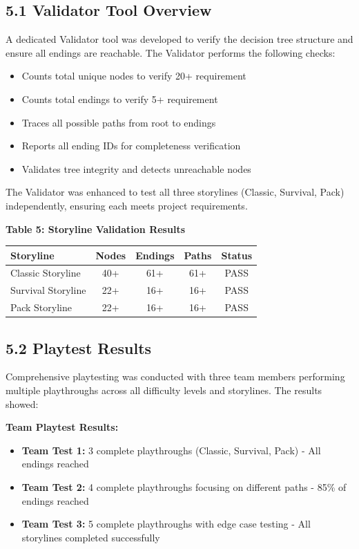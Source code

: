 \documentclass[12pt,a4paper]{article}
\begin{document}
\subsection{5.1 Validator Tool Overview}
A dedicated Validator tool was developed to verify the decision tree structure and ensure all endings are reachable. The Validator performs the following checks:
\begin{itemize}
	\item Counts total unique nodes to verify 20+ requirement
	\item Counts total endings to verify 5+ requirement
	\item Traces all possible paths from root to endings
	\item Reports all ending IDs for completeness verification
	\item Validates tree integrity and detects unreachable nodes
\end{itemize}

The Validator was enhanced to test all three storylines (Classic, Survival, Pack) independently, ensuring each meets project requirements.

\textbf{Table 5: Storyline Validation Results}
\begin{center}
	\begin{tabular}{@{}lcccc@{}}
		\toprule
		\textbf{Storyline} & \textbf{Nodes} & \textbf{Endings} & \textbf{Paths} & \textbf{Status} \\ \midrule
		Classic Storyline  & 40+            & 61+              & 61+            & \checkmark PASS \\
		Survival Storyline & 22+            & 16+              & 16+            & \checkmark PASS \\
		Pack Storyline     & 22+            & 16+              & 16+            & \checkmark PASS \\
		\bottomrule
	\end{tabular}
\end{center}

\vspace{0.3cm}

\subsection{5.2 Playtest Results}
Comprehensive playtesting was conducted with three team members performing multiple playthroughs across all difficulty levels and storylines. The results showed:

\textbf{Team Playtest Results:}
\begin{itemize}
	\item \textbf{Team Test 1:} 3 complete playthroughs (Classic, Survival, Pack) - All endings reached
	\item \textbf{Team Test 2:} 4 complete playthroughs focusing on different paths - 85\% of endings reached
	\item \textbf{Team Test 3:} 5 complete playthroughs with edge case testing - All storylines completed successfully
\end{itemize}
\end{document}
